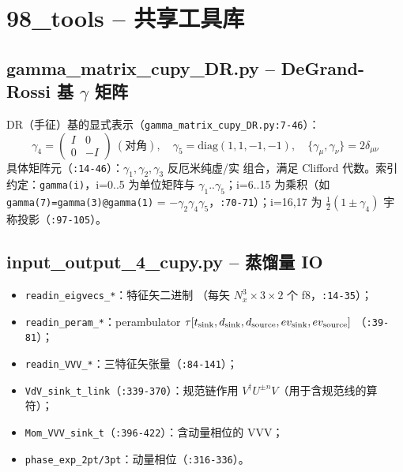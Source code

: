 \documentclass[UTF8]{ctexart}
\begin{document}
\section{98\_tools -- 共享工具库}

\subsection{gamma\_matrix\_cupy\_DR.py -- DeGrand-Rossi 基 $\gamma$ 矩阵}

DR（手征）基的显式表示（\texttt{gamma\_matrix\_cupy\_DR.py:7-46}）：
\begin{equation}
  \gamma_4 = \begin{pmatrix} I & 0\\ 0 & -I \end{pmatrix}\ (\text{对角}),
  \quad \gamma_5 = \mathrm{diag}(1,1,-1,-1), \quad
  \{\gamma_\mu,\gamma_\nu\}=2\delta_{\mu\nu}
\end{equation}
具体矩阵元（\texttt{:14-46}）：$\gamma_1,\gamma_2,\gamma_3$ 反厄米纯虚/实
组合，满足 Clifford 代数。索引约定：\texttt{gamma(i)}，i=0..5 为单位矩阵与
$\gamma_1..\gamma_5$；i=6..15 为乘积（如 \texttt{gamma(7)=gamma(3)@gamma(1)}
= $-\gamma_2\gamma_4\gamma_5$，\texttt{:70-71}）；i=16,17 为
$\tfrac12(1\pm\gamma_4)$ 宇称投影（\texttt{:97-105}）。

\subsection{input\_output\_4\_cupy.py -- 蒸馏量 IO}

\begin{itemize}
  \item \texttt{readin\_eigvecs\_*}：特征矢二进制
        （每矢 $N_x^3\times 3\times 2$ 个 f8，\texttt{:14-35}）；
  \item \texttt{readin\_peram\_*}：perambulator
        $\tau[t_{\rm sink},d_{\rm sink},d_{\rm source},ev_{\rm sink},ev_{\rm source}]$
        （\texttt{:39-81}）；
  \item \texttt{readin\_VVV\_*}：三特征矢张量（\texttt{:84-141}）；
  \item \texttt{VdV\_sink\_t\_link}（\texttt{:339-370}）：规范链作用
        $V^\dagger U^{\pm n}V$（用于含规范线的算符）；
  \item \texttt{Mom\_VVV\_sink\_t}（\texttt{:396-422}）：含动量相位的 VVV；
  \item \texttt{phase\_exp\_2pt/3pt}：动量相位（\texttt{:316-336}）。
\end{itemize}
\end{document}
